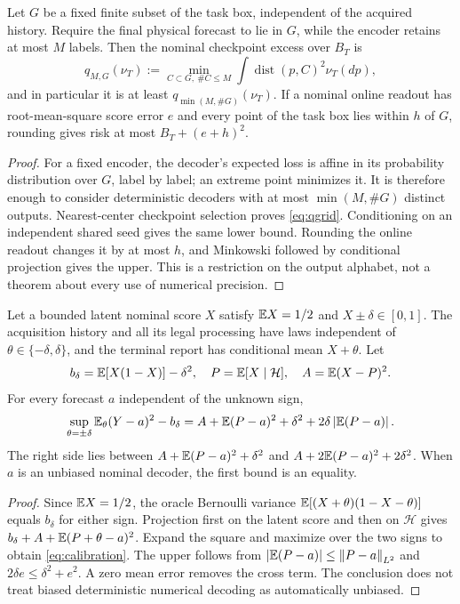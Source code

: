\begin{proposition}\label{prop:output}
Let $G$ be a fixed finite subset of the task box, independent of the acquired history. Require the final physical forecast to lie in $G$, while the encoder retains at most $M$ labels. Then the nominal checkpoint excess over $B_T$ is
\begin{equation}\label{eq:qgrid}
 q_{M,G}(\nu_T)
  :=\min_{C\subset G,\ \#C\le M}\int\operatorname{dist}(p,C)^2\nu_T(dp),
\end{equation}
and in particular it is at least $q_{\min(M,\#G)}(\nu_T)$. If a nominal online readout has root-mean-square score error $e$ and every point of the task box lies within $h$ of $G$, rounding gives risk at most $B_T+(e+h)^2$.
\end{proposition}
\begin{proof}
For a fixed encoder, the decoder's expected loss is affine in its probability distribution over $G$, label by label; an extreme point minimizes it. It is therefore enough to consider deterministic decoders with at most $\min(M,\#G)$ distinct outputs. Nearest-center checkpoint selection proves \eqref{eq:qgrid}. Conditioning on an independent shared seed gives the same lower bound. Rounding the online readout changes it by at most $h$, and Minkowski followed by conditional projection gives the upper. This is a restriction on the output alphabet, not a theorem about every use of numerical precision.
\end{proof}

\begin{lemma}\label{lem:calibration}
Let a bounded latent nominal score $X$ satisfy $\mathbb E X=1/2$ and $X\pm\delta\in[0,1]$. The acquisition history and all its legal processing have laws independent of $\theta\in\{-\delta,\delta\}$, and the terminal report has conditional mean $X+\theta$. Let
\[
 b_\delta=\mathbb E[X(1-X)]-\delta^2,
 \quad P=\mathbb E[X\mid\mathcal H],\quad A=\mathbb E(X-P)^2.
\]
For every forecast $a$ independent of the unknown sign,
\begin{equation}\label{eq:calibration}
 \sup_{\theta=\pm\delta}\mathbb E_\theta(Y-a)^2-b_\delta
 =A+\mathbb E(P-a)^2+\delta^2+2\delta\left|\mathbb E(P-a)\right|.
\end{equation}
The right side lies between $A+\mathbb E(P-a)^2+\delta^2$ and $A+2\mathbb E(P-a)^2+2\delta^2$. When $a$ is an unbiased nominal decoder, the first bound is an equality.
\end{lemma}
\begin{proof}
Since $\mathbb E X=1/2$, the oracle Bernoulli variance $\mathbb E[(X+\theta)(1-X-\theta)]$ equals $b_\delta$ for either sign. Projection first on the latent score and then on $\mathcal H$ gives $b_\delta+A+\mathbb E(P+\theta-a)^2$. Expand the square and maximize over the two signs to obtain \eqref{eq:calibration}. The upper follows from $\left|\mathbb E(P-a)\right|\le\left\lVert P-a\right\rVert_{L^2}$ and $2\delta e\le\delta^2+e^2$. A zero mean error removes the cross term. The conclusion does not treat biased deterministic numerical decoding as automatically unbiased.
\end{proof}

